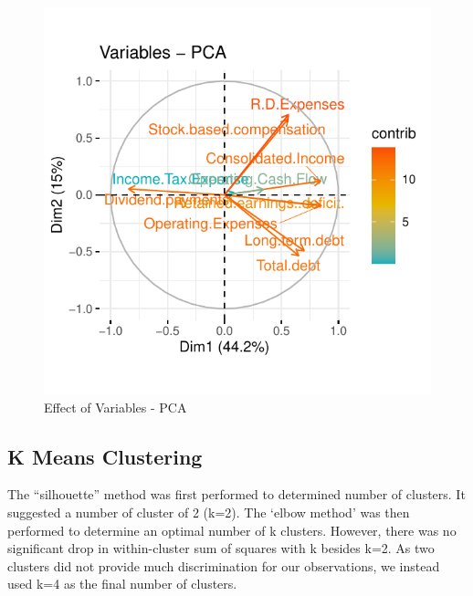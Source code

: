 \documentclass[11pt,]{article}
\begin{document}
\begin{figure}

{\centering \includegraphics{stock_analysis_files/figure-latex/PCAvar-1} 

}

\caption{Effect of Variables - PCA}\label{fig:PCAvar}
\end{figure}

\hypertarget{k-means-clustering}{%
\subsection{K Means Clustering}\label{k-means-clustering}}

The ``silhouette'' method was first performed to determined number of
clusters. It suggested a number of cluster of 2 (k=2). The `elbow
method' was then performed to determine an optimal number of k clusters.
However, there was no significant drop in within-cluster sum of squares
with k besides k=2. As two clusters did not provide much discrimination
for our observations, we instead used k=4 as the final number of
clusters.
\end{document}
